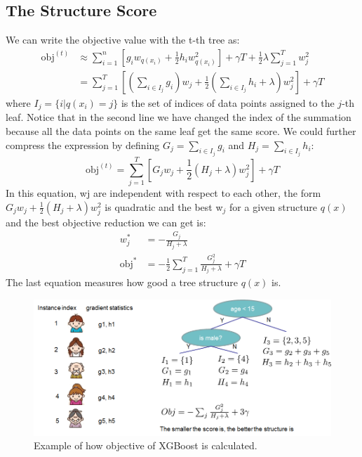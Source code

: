 \documentclass[a3paper, 12pt]{book} %
\begin{document}
\subsection{The Structure Score}
We can write the objective value with the t-th tree as:
\begin{equation}
\begin{split}\mathrm{obj}^{(t)} &\approx \sum_{i=1}^n [g_i w_{q(x_i)} + \frac{1}{2} h_i w_{q(x_i)}^2] + \gamma T + \frac{1}{2}\lambda \sum_{j=1}^T w_j^2\\
&= \sum^T_{j=1} [(\sum_{i\in I_j} g_i) w_j + \frac{1}{2} (\sum_{i\in I_j} h_i + \lambda) w_j^2 ] + \gamma T\end{split}
\end{equation}
where $I_j=\{i|q(x_i)=j\}$ is the set of indices of data points assigned to the $j$-th leaf. Notice that in the second line we have changed the index of the summation because all the data points on the same leaf get the same score. We could further compress the expression by defining $G_j = \sum_{i\in I_j} g_i$ and $H_j = \sum_{i\in I_j} h_i$:
\begin{equation}
\mathrm{obj}^{(t)} = \sum^T_{j=1} [G_jw_j + \frac{1}{2} (H_j+\lambda) w_j^2] +\gamma T
\end{equation}
In this equation, wj are independent with respect to each other, the form $G_jw_j+\frac{1}{2}(H_j+\lambda)w^2_j$ is quadratic and the best w$_j$ for a given structure $q(x)$ and the best objective reduction we can get is:
\begin{equation}
\begin{split}w_j^\ast &= -\frac{G_j}{H_j+\lambda}\\
\mathrm{obj}^\ast &= -\frac{1}{2} \sum_{j=1}^T \frac{G_j^2}{H_j+\lambda} + \gamma T\end{split}
\end{equation}
The last equation measures how good a tree structure $q(x)$ is.

\begin{figure}[htpb]
	\centering
	\includegraphics[width=13cm]{figures/xgboost_struct_score.png}
	\caption{Example of how objective of XGBoost is calculated.}
	\label{fig:boat1}
\end{figure}
\end{document}
